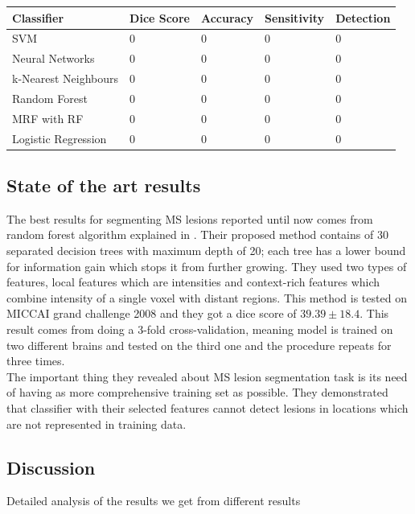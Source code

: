 \documentclass{article} %
\begin{document}
\begin{center}
\centering
\begin{tabular}{ | m{7em} | m{2cm}| m{2cm} | m{2cm} | m{2cm} | } 
\hline
\textbf{Classifier} & \textbf{Dice Score} & \textbf{Accuracy} & \textbf{Sensitivity} & \textbf{Detection}\\ 
\hline
SVM & 0 & 0 & 0 & 0  \\ 
\hline
Neural Networks & 0 & 0 & 0 & 0 \\ 
\hline
k-Nearest Neighbours & 0 & 0 & 0 & 0 \\ 
\hline
Random Forest & 0 & 0 & 0 & 0 \\ 
\hline
MRF with RF & 0 & 0 & 0 & 0 \\ 
\hline
Logistic Regression & 0 & 0 & 0 & 0 \\ 
\hline
\end{tabular}
\end{center}

\subsection{State of the art results}
The best results for segmenting MS lesions reported until now comes from random forest algorithm explained in \cite{geremia2011spatial}. Their proposed method contains of 30 separated decision trees with maximum depth of 20; each tree has a lower bound for information gain which stops it from further growing. They used two types of features, local features which are intensities and context-rich features which combine intensity of a single voxel with distant regions. This method is tested on MICCAI grand challenge 2008 and they got a dice score of $39.39 \pm 18.4$. This result comes from doing a 3-fold cross-validation, meaning model is trained on two different brains and tested on the third one and the procedure repeats for three times.\\
The important thing they revealed about MS lesion segmentation task is its need of having as more comprehensive training set as possible. They demonstrated that classifier with their selected features cannot detect lesions in locations which are not represented in training data.
\subsection{Discussion}
Detailed analysis of the results we get from different results

\end{document}
